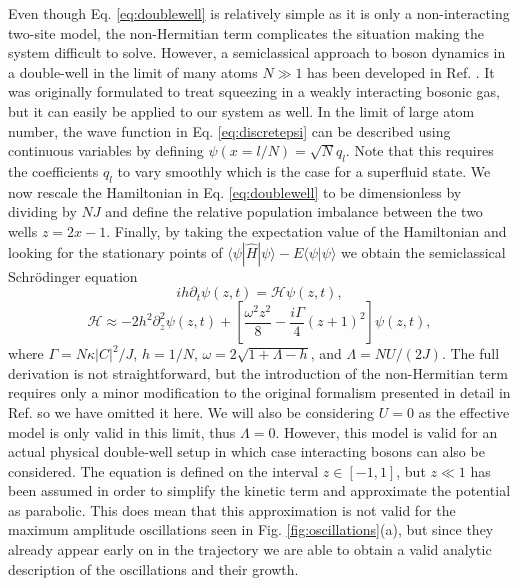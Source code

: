 Even though Eq. \eqref{eq:doublewell} is relatively simple as it is
only a non-interacting two-site model, the non-Hermitian term
complicates the situation making the system difficult to
solve. However, a semiclassical approach to boson dynamics in a
double-well in the limit of many atoms $N \gg 1$ has been developed in
Ref. \cite{juliadiaz2012}. It was originally formulated to treat
squeezing in a weakly interacting bosonic gas, but it can easily be
applied to our system as well. In the limit of large atom number, the
wave function in Eq. \eqref{eq:discretepsi} can be described using
continuous variables by defining $\psi (x = l / N) = \sqrt{N}
q_l$. Note that this requires the coefficients $q_l$ to vary smoothly
which is the case for a superfluid state. We now rescale the
Hamiltonian in Eq. \eqref{eq:doublewell} to be dimensionless by
dividing by $NJ$ and define the relative population imbalance between
the two wells $z = 2x - 1$. Finally, by taking the expectation value
of the Hamiltonian and looking for the stationary points of
$\langle \psi | \hat{H} | \psi \rangle - E \langle \psi | \psi
\rangle$ we obtain the semiclassical Schr\"{o}dinger equation
\begin{equation}
  \label{eq:semicl}
  i h \partial_t \psi(z, t) = \mathcal{H} \psi(z, t),
\end{equation}
\begin{equation}
  \label{eq:semiH}
  \mathcal{H} \approx -2 h^2 \partial^2_z \psi(z, t) + \left[
    \frac{\omega^2 z^2} {8} - \frac{i \Gamma} {4} \left( z + 1
    \right)^2 \right] \psi(z, t),
\end{equation}
where $\Gamma = N \kappa |C|^2 / J$, $h = 1/N$,
$\omega = 2 \sqrt{1 + \Lambda - h}$, and $\Lambda = NU / (2J)$. The
full derivation is not straightforward, but the introduction of the
non-Hermitian term requires only a minor modification to the original
formalism presented in detail in Ref. \cite{juliadiaz2012} so we have
omitted it here. We will also be considering $U = 0$ as the effective
model is only valid in this limit, thus $\Lambda = 0$. However, this
model is valid for an actual physical double-well setup in which case
interacting bosons can also be considered. The equation is defined on
the interval $z \in [-1, 1]$, but $z \ll 1$ has been assumed in order
to simplify the kinetic term and approximate the potential as
parabolic. This does mean that this approximation is not valid for the
maximum amplitude oscillations seen in Fig. \ref{fig:oscillations}(a),
but since they already appear early on in the trajectory we are able
to obtain a valid analytic description of the oscillations and their
growth.

